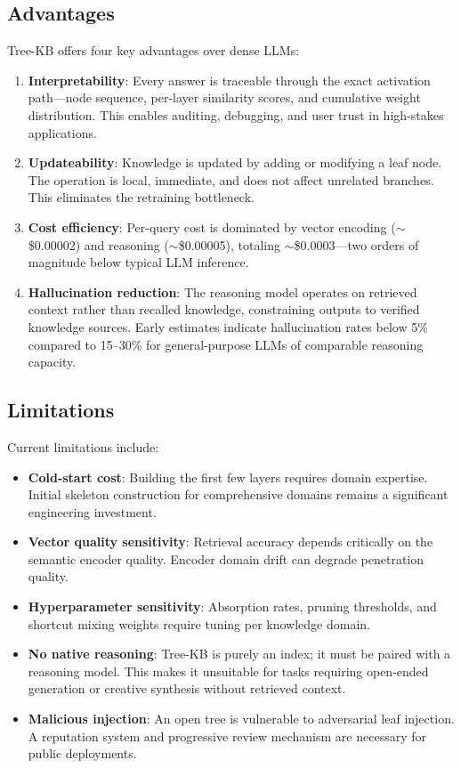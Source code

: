 \documentclass[11pt,a4paper]{article}
\begin{document}
\subsection{Advantages}

Tree-KB offers four key advantages over dense LLMs:

\begin{enumerate}
    \item \textbf{Interpretability}: Every answer is traceable through the exact activation path---node sequence, per-layer similarity scores, and cumulative weight distribution. This enables auditing, debugging, and user trust in high-stakes applications.
    \item \textbf{Updateability}: Knowledge is updated by adding or modifying a leaf node. The operation is local, immediate, and does not affect unrelated branches. This eliminates the retraining bottleneck.
    \item \textbf{Cost efficiency}: Per-query cost is dominated by vector encoding ($\sim$\$0.00002) and reasoning ($\sim$\$0.00005), totaling $\sim$\$0.0003---two orders of magnitude below typical LLM inference.
    \item \textbf{Hallucination reduction}: The reasoning model operates on retrieved context rather than recalled knowledge, constraining outputs to verified knowledge sources. Early estimates indicate hallucination rates below 5\% compared to 15--30\% for general-purpose LLMs of comparable reasoning capacity.
\end{enumerate}

\subsection{Limitations}

Current limitations include:

\begin{itemize}
    \item \textbf{Cold-start cost}: Building the first few layers requires domain expertise. Initial skeleton construction for comprehensive domains remains a significant engineering investment.
    \item \textbf{Vector quality sensitivity}: Retrieval accuracy depends critically on the semantic encoder quality. Encoder domain drift can degrade penetration quality.
    \item \textbf{Hyperparameter sensitivity}: Absorption rates, pruning thresholds, and shortcut mixing weights require tuning per knowledge domain.
    \item \textbf{No native reasoning}: Tree-KB is purely an index; it must be paired with a reasoning model. This makes it unsuitable for tasks requiring open-ended generation or creative synthesis without retrieved context.
    \item \textbf{Malicious injection}: An open tree is vulnerable to adversarial leaf injection. A reputation system and progressive review mechanism are necessary for public deployments.
\end{itemize}
\end{document}
